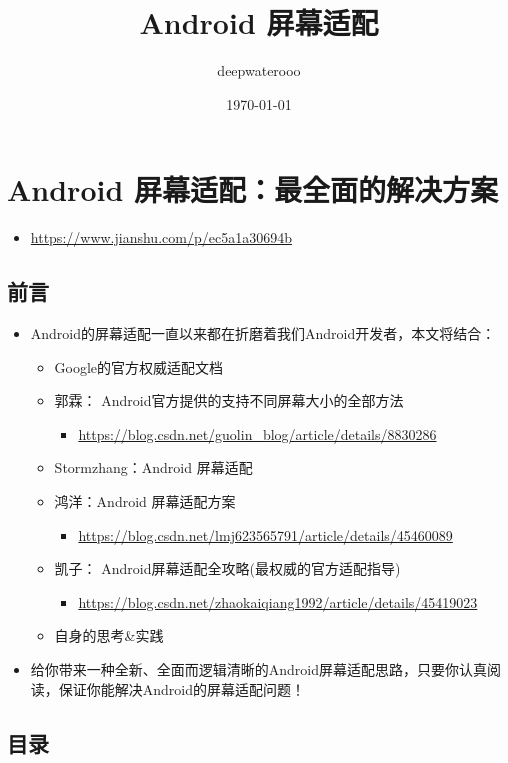 \documentclass[9pt, b5paper]{article}
\author{deepwaterooo}
\date{\today}
\title{Android 屏幕适配}
\begin{document}
\maketitle
\tableofcontents


\section{Android 屏幕适配：最全面的解决方案}
\label{sec-1}
\begin{itemize}
\item \url{https://www.jianshu.com/p/ec5a1a30694b}
\end{itemize}
\subsection{前言}
\label{sec-1-1}
\begin{itemize}
\item Android的屏幕适配一直以来都在折磨着我们Android开发者，本文将结合：
\begin{itemize}
\item Google的官方权威适配文档
\item 郭霖： Android官方提供的支持不同屏幕大小的全部方法 
\begin{itemize}
\item \url{https://blog.csdn.net/guolin_blog/article/details/8830286}
\end{itemize}
\item Stormzhang：Android 屏幕适配
\item 鸿洋：Android 屏幕适配方案
\begin{itemize}
\item \url{https://blog.csdn.net/lmj623565791/article/details/45460089}
\end{itemize}
\item 凯子： Android屏幕适配全攻略(最权威的官方适配指导)
\begin{itemize}
\item \url{https://blog.csdn.net/zhaokaiqiang1992/article/details/45419023}
\end{itemize}
\item 自身的思考\&实践
\end{itemize}
\item 给你带来一种全新、全面而逻辑清晰的Android屏幕适配思路，只要你认真阅读，保证你能解决Android的屏幕适配问题！
\end{itemize}
\subsection{目录}
\label{sec-1-2}
\end{document}
